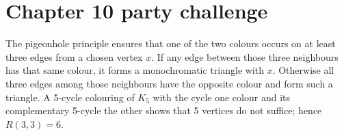 \section*{Chapter 10 party challenge}
The pigeonhole principle ensures that one of the two colours occurs on at least three edges from a chosen vertex $x$. If any edge between those three neighbours has that same colour, it forms a monochromatic triangle with $x$. Otherwise all three edges among those neighbours have the opposite colour and form such a triangle. A 5-cycle colouring of $K_5$ with the cycle one colour and its complementary 5-cycle the other shows that 5 vertices do not suffice; hence $R(3,3)=6$.
